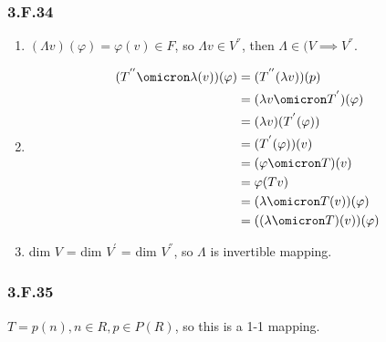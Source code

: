 \subsubsection*{3.F.34}
\begin{enumerate}[label=(\alph*)]
\item 
$(\Lambda v)(\varphi) = \varphi(v) \in F$, so $\Lambda v \in V^{''}$, then $\Lambda \in (V \implies V^{''}$.

\item
\begin{equation*}
    \begin{split}
    (T^{''}\omicron \lambda (v))(\varphi) &= (T^{''}(\lambda v))(p) \\
    &= (\lambda v \omicron T^{'})(\varphi) \\
    &= (\lambda v)(T^{'}(\varphi)) \\
    &= (T^{'}(\varphi))(v) \\
    &= (\varphi \omicron T)(v) \\
    &= \varphi(Tv) \\
    &= (\lambda \omicron T(v))(\varphi) \\
    &= ((\lambda \omicron T)(v))(\varphi)

\end{split}
\end{equation*}

\item
dim $V$ = dim $V^{'}$ = dim $V^{''}$, so $\Lambda$ is invertible mapping.
\end{enumerate}

\subsubsection*{3.F.35}

$T = {p(n), n\in R, p\in P(R)}$, so this is a 1-1 mapping.
\newpage